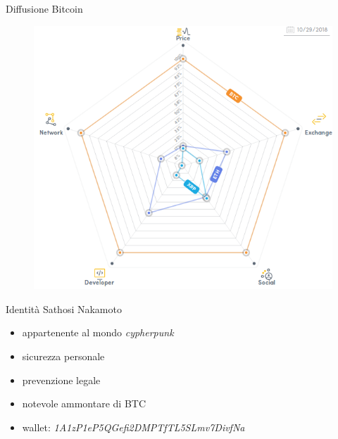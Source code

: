 \documentclass{beamer}
\begin{document}
\begin{frame}{Diffusione Bitcoin}
	\begin{figure}
		\centering
        \includegraphics[width=0.8\linewidth]{./images/crypto_economics.png}
	\end{figure}
\end{frame}

\begin{frame}{Identità Sathosi Nakamoto}
	\begin{itemize}
        \item appartenente al mondo \textit{cypherpunk}
        \item sicurezza personale
        \item prevenzione legale
        \item notevole ammontare di BTC
        \item wallet: \emph{1A1zP1eP5QGefi2DMPTfTL5SLmv7DivfNa}
    \end{itemize}
\end{frame}

\end{document}
